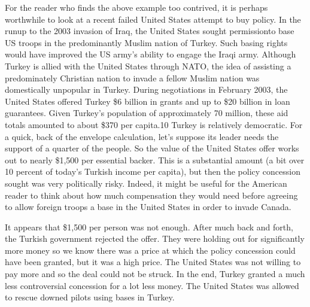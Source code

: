 \documentclass[10pt]{article}
\begin{document}
{\large For the reader who finds the above example too contrived, it is perhaps
worthwhile to look at a recent failed United States attempt to buy policy. In the
runup to the 2003 invasion of Iraq, the United States sought permissionto base US
troops in the predominantly Muslim nation of Turkey. Such basing rights would
have improved the US army's ability to engage the Iraqi army. Although Turkey is
allied with the United States through NATO, the idea of assisting a predominately
Christian nation to invade a fellow Muslim nation was domestically unpopular in
Turkey. During negotiations in February 2003, the United States offered Turkey
\$6 billion in grants and up to \$20 billion in loan guarantees. Given Turkey's
population of approximately 70 million, these aid totals amounted to about \$370
per capita.10 Turkey is relatively democratic. For a quick, back of the envelope
calculation, let's suppose its leader needs the support of a quarter of the
people. So the value of the United States offer works out to nearly \$1,500 per
essential backer. This is a substantial amount (a bit over 10 percent of today's
Turkish income per capita), but then the policy concession sought was very
politically risky. Indeed, it might be useful for the American reader to think
about how much compensation they would need before agreeing to allow foreign
troops a base in the United States in order to invade Canada.}

{\large It appears that \$1,500 per person was not enough. After much back and
forth, the Turkish government rejected the offer. They were holding out for
significantly more money so we know there was a price at which the policy
concession could have been granted, but it was a high price. The United States
was not willing to pay more and so the deal could not be struck. In the end,
Turkey granted a much less controversial concession for a lot less money. The
United States was allowed to rescue downed pilots using bases in Turkey.}
\end{document}
